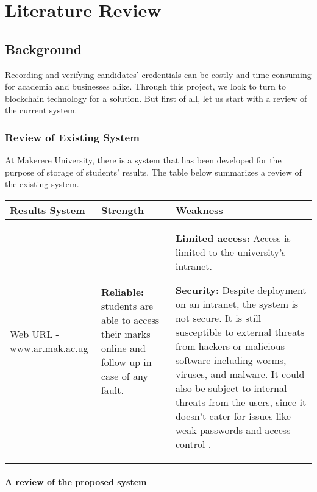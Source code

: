 \chapter{Literature Review}

\section{Background}

Recording and verifying candidates' credentials can be costly and time-consuming for academia and businesses alike. Through this project, we look to turn to blockchain technology for a solution. But first of all, let us start with a review of the current system.\\

\subsection{Review of Existing System}
At Makerere University, there is a system that has been developed for the purpose of storage of students’ results. The table below summarizes a review of the existing system.

\begin{tabular}{|p{3cm}|p{4cm}|p{7cm}|}
\hline
Results System&Strength&Weakness\\
\hline
\hline
Web URL - www.ar.mak.ac.ug& \textbf{Reliable:} students are able to access their marks online and follow up in case of any fault.& \textbf{Limited access:} Access is limited to the university’s intranet. 

\textbf{Security:} Despite deployment on an intranet, the system is not secure. It is still susceptible to external threats from hackers or malicious software including worms, viruses, and malware. It could also be subject to internal threats from the users, since it doesn’t cater for issues like weak passwords and access control \cite{art4}.
\\ 
\hline

\end{tabular}

\subsubsection{A review of the proposed system}

